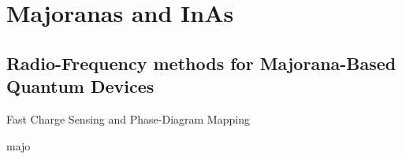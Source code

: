 \chapter{Majoranas and InAs}
\label{sec:majoinas}

\clearpage
\section{Radio-Frequency methods for {Majorana-Based} {Quantum} {Devices}}
{\large \bf \begin{center}Fast Charge Sensing and Phase-Diagram Mapping\end{center}}
\label{sec:rfmajo}
{majo}